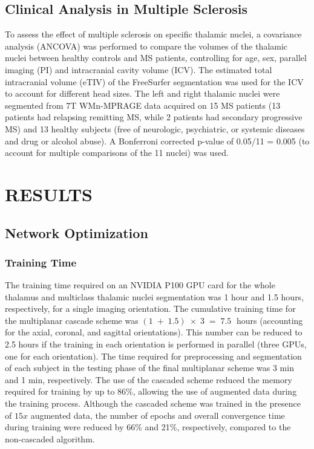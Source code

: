 \documentclass[3p,,final,12pt]{elsarticle}
\begin{document}
\subsection{Clinical Analysis in Multiple Sclerosis} To assess the effect of multiple sclerosis on specific thalamic nuclei, a covariance analysis (ANCOVA) was performed to compare the volumes of the thalamic nuclei between healthy controls and MS patients, controlling for age, sex, parallel imaging (PI) and intracranial cavity volume (ICV). The estimated total intracranial volume (eTIV) of the FreeSurfer segmentation was used for the ICV to account for different head sizes. The left and right thalamic nuclei were segmented from 7T WMn-MPRAGE data acquired on 15 MS patients (13 patients had relapsing remitting MS, while 2 patients had secondary progressive MS) and 13 healthy subjects (free of neurologic, psychiatric, or systemic diseases and drug or alcohol abuse). A Bonferroni corrected p-value of 0.05/11 = 0.005 (to account for multiple comparisons of the 11 nuclei) was used.
    
\section{RESULTS}




\subsection{Network Optimization}



\subsubsection{Training Time} The training time required on an NVIDIA P100 GPU card for the whole thalamus and multiclass thalamic nuclei segmentation was 1 hour and 1.5 hours, respectively, for a single imaging orientation. The cumulative training time for the multiplanar cascade scheme was $(1\;+\;1.5)\;\times\;3\;=\;7.5\; $ hours (accounting for the axial, coronal, and sagittal orientations). This number can be reduced to 2.5 hours if the training in each orientation is performed in parallel (three GPUs, one for each orientation). The time required for preprocessing and segmentation of each subject in the testing phase of the final multiplanar scheme was 3 min and 1 min, respectively. The use of the cascaded scheme reduced the memory required for training by up to 86\%, allowing the use of augmented data during the training process. Although the cascaded scheme was trained in the presence of $15x $ augmented data, the number of epochs and overall convergence time during training were reduced by 66\% and 21\%, respectively, compared to the non-cascaded algorithm. 
\end{document}
